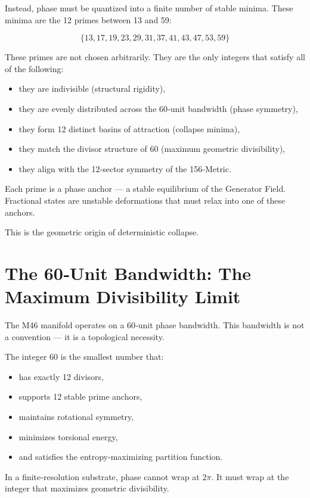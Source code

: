 \documentclass[reprint,amsmath,amssymb,aps,prl,floatfix]{revtex4-2}
\begin{document}
\begin{itemize}
Instead, phase must be quantized into a finite number of stable minima.  
These minima are the 12 primes between 13 and 59:

\[
\{13, 17, 19, 23, 29, 31, 37, 41, 43, 47, 53, 59\}
\]

These primes are not chosen arbitrarily.  
They are the only integers that satisfy all of the following:
\medskip

\begin{itemize}
\item they are indivisible (structural rigidity),  
\item they are evenly distributed across the 60‑unit bandwidth (phase symmetry),  
\item they form 12 distinct basins of attraction (collapse minima),  
\item they match the divisor structure of 60 (maximum geometric divisibility),  
\item they align with the 12‑sector symmetry of the 156‑Metric.
\end{itemize}
\medskip

Each prime is a phase anchor — a stable equilibrium of the Generator Field.  
Fractional states are unstable deformations that must relax into one of these anchors.
\medskip

This is the geometric origin of deterministic collapse.

\section{The 60‑Unit Bandwidth: The Maximum Divisibility Limit}

The M46 manifold operates on a 60‑unit phase bandwidth.  
This bandwidth is not a convention — it is a topological necessity.
\medskip

The integer 60 is the smallest number that:
\begin{itemize}
\item has exactly 12 divisors,  
\item supports 12 stable prime anchors,  
\item maintains rotational symmetry,  
\item minimizes torsional energy,  
\item and satisfies the entropy‑maximizing partition function.
\end{itemize}
\medskip

In a finite‑resolution substrate, phase cannot wrap at \(2\pi\).  
It must wrap at the integer that maximizes geometric divisibility.
\medskip


\end{itemize}
\end{document}
